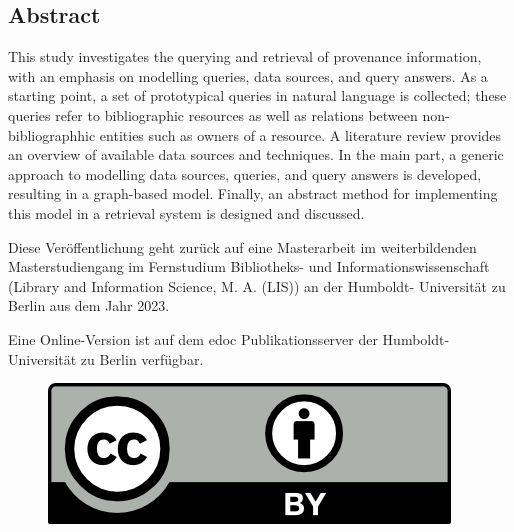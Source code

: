 \vspace*{\fill}
\subsection*{\textrm{Abstract}}
This study investigates the querying and retrieval of provenance information,
with an emphasis on modelling queries, data sources, and query answers.
As a starting point, a set of prototypical queries in natural language is collected;
these queries refer to bibliographic resources as well as relations between non-bibliographhic entities such as owners
of a resource. 
A literature review provides an overview of available data sources and techniques.
In the main part, a generic approach to modelling data sources,
queries, and query answers is developed, resulting in a graph-based model.
Finally, an abstract method for implementing this model in a retrieval system is designed and discussed.


\vspace*{\fill}
Diese Veröffentlichung geht zurück auf eine Masterarbeit im weiterbildenden Ma\-ster\-stu\-di\-en\-gang im Fernstudium Bibliotheks- und Informationswissenschaft (\foreignlanguage{english}{Library and Information Science}, M. A. (LIS)) an der Humboldt- Universität zu Berlin aus dem Jahr 2023.\par
%
%
%
%
Eine Online-Version ist auf dem edoc Publikationsserver der Humboldt-Universität zu Berlin verfügbar. \par

\begin{figure}
\vspace{-.481cm}
\includegraphics[scale=.7]{BHR_template/by.png}
\end{figure}

